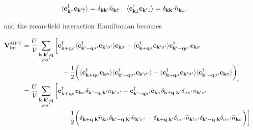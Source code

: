 \begin{align}
    \langle {\bf c}_{{\bf k}\uparrow}^\dagger {\bf c}_{{\bf k}'\uparrow} \rangle &= \delta_{{\bf k} {\bf k}'} \bar{n}_{{\bf k} \uparrow} & \langle {\bf c}_{{\bf k}\downarrow}^\dagger {\bf c}_{{\bf k}'\downarrow} \rangle &= \delta_{{\bf k} {\bf k}'} \bar{n}_{{\bf k} \downarrow}, 
\end{align}

and the mean-field interaction Hamiltonian becomes 

\begin{align*}
    {\bf V}_{\textnormal{int}}^{\textnormal{MFT}} &= \frac{U}{\mathcal{V}} \sum_{\substack{{\bf k}, {\bf k}', {\bf q} \\
          {\sigma \sigma'}}} \bigg[ {\bf c}_{{\bf k + q}\sigma}^\dagger \langle {\bf c}_{{\bf k'-q}\sigma'}^\dagger {\bf c}_{{\bf k}'\sigma'} \rangle {\bf c}_{{\bf k}\sigma} - \langle {\bf c}_{{\bf k + q}\sigma}^\dagger {\bf c}_{{\bf k}'\sigma'} \rangle {\bf c}_{{\bf k'-q}\sigma'}^\dagger {\bf c}_{{\bf k}\sigma}  \\
          &  \blanky \blanky \blanky \blanky \blanky \blanky \blanky \blanky \blanky \blanky \blanky \blanky \blanky \blanky \blanky \blanky \blanky \blanky   -\frac{1}{2} \bigg( \langle {\bf c}_{{\bf k + q}\sigma}^\dagger {\bf c}_{{\bf k}\sigma} \rangle \langle {\bf c}_{{\bf k' - q}\sigma'}^\dagger {\bf c}_{{\bf k}'\sigma'} \rangle - \langle {\bf c}_{{\bf k + q}\sigma}^\dagger {\bf c}_{{\bf k}'\sigma'} \rangle \langle {\bf c}_{{\bf k' - q}\sigma'}^\dagger {\bf c}_{{\bf k}\sigma} \rangle  \bigg)  \bigg] \\
          &= \frac{U}{\mathcal{V}} \sum_{\substack{{\bf k}, {\bf k}', {\bf q} \\
          {\sigma \sigma'}}} 
          \bigg[ {\bf c}_{{\bf k + q}\sigma}^\dagger {\bf c}_{{\bf k}\sigma} \delta_{{\bf k'-q} \blanky {\bf k}'} \bar{n}_{{\bf k'} \sigma'} - {\bf c}_{{\bf k'-q}\sigma'}^\dagger {\bf c}_{{\bf k}\sigma} \delta_{{\bf k+q} \blanky {\bf k}'} \delta_{\sigma \sigma'} \bar{n}_{{\bf k}' \sigma'} \\
          & \blanky \blanky \blanky \blanky \blanky \blanky \blanky \blanky \blanky \blanky \blanky \blanky \blanky \blanky \blanky \blanky \blanky \blanky  - \frac{1}{2} \bigg(\delta_{{\bf k+q} \blanky {\bf k}} \bar{n}_{{\bf k} \sigma} \delta_{{\bf k'-q} \blanky {\bf k}'} \bar{n}_{{\bf k}' \sigma'} - \delta_{{\bf k+q} \blanky {\bf k}'} \delta_{\sigma \sigma'} \bar{n}_{{\bf k}' \sigma'} \delta_{{\bf k'-q} \blanky {\bf k}} \delta_{\sigma \sigma'} \bar{n}_{{\bf k} \sigma} \bigg) \bigg] \\

\end{align*}
